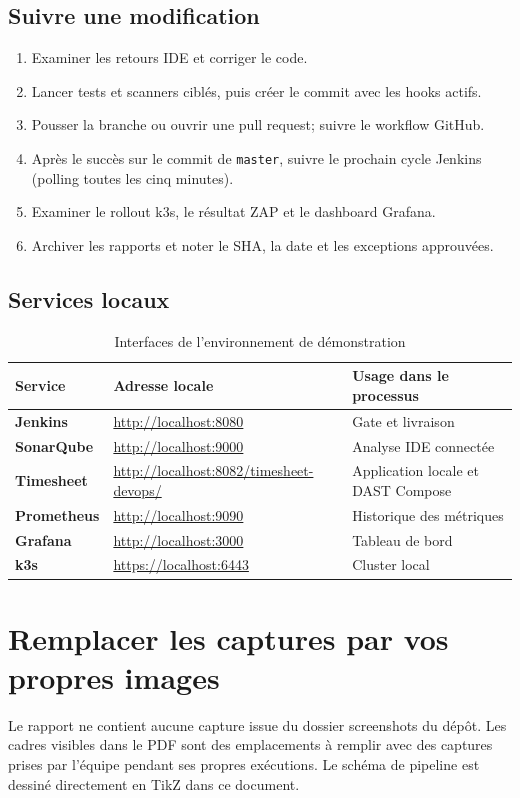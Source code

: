 \documentclass[11pt,a4paper,oneside]{report}
\begin{document}
\section{Suivre une modification}
\begin{enumerate}
  \item Examiner les retours IDE et corriger le code.
  \item Lancer tests et scanners ciblés, puis créer le commit avec les hooks actifs.
  \item Pousser la branche ou ouvrir une pull request; suivre le workflow GitHub.
  \item Après le succès sur le commit de \texttt{master}, suivre le prochain cycle Jenkins (polling toutes les cinq minutes).
  \item Examiner le rollout k3s, le résultat ZAP et le dashboard Grafana.
  \item Archiver les rapports et noter le SHA, la date et les exceptions approuvées.
\end{enumerate}

\section{Services locaux}
\begin{table}[H]
\centering
\caption{Interfaces de l'environnement de démonstration}
\begin{tabularx}{\textwidth}{@{}>{\bfseries}p{3.6cm}p{5.1cm}X@{}}
\toprule
Service & Adresse locale & Usage dans le processus \\
\midrule
Jenkins & \url{http://localhost:8080} & Gate et livraison \\
SonarQube & \url{http://localhost:9000} & Analyse IDE connectée \\
Timesheet & \url{http://localhost:8082/timesheet-devops/} & Application locale et DAST Compose \\
Prometheus & \url{http://localhost:9090} & Historique des métriques \\
Grafana & \url{http://localhost:3000} & Tableau de bord \\
k3s & \url{https://localhost:6443} & Cluster local \\
\bottomrule
\end{tabularx}
\end{table}

\appendix
\chapter{Remplacer les captures par vos propres images}
Le rapport ne contient aucune capture issue du dossier screenshots du dépôt. Les cadres visibles dans le PDF sont des emplacements à remplir avec des captures prises par l'équipe pendant ses propres exécutions. Le schéma de pipeline est dessiné directement en TikZ dans ce document.
\end{document}

